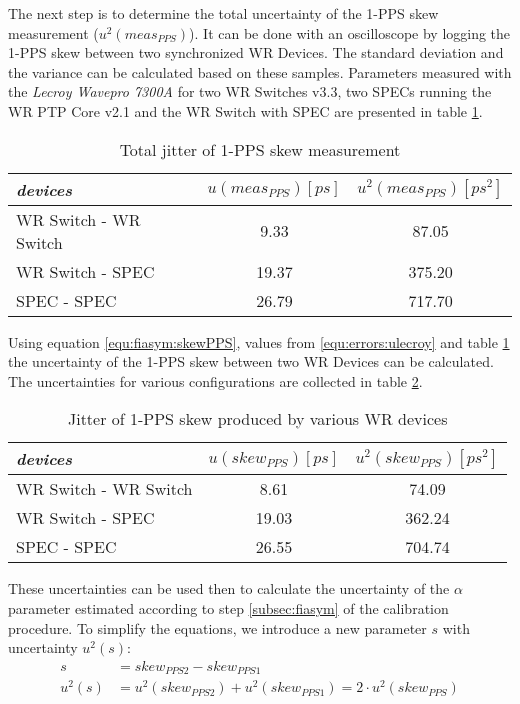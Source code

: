 The next step is to determine the total uncertainty of the 1-PPS skew measurement
($u^2(meas_{PPS})$). It can be done with an oscilloscope by logging the 1-PPS
skew between two synchronized WR Devices. The standard deviation and the
variance can be calculated based on these samples. Parameters measured with the
\emph{Lecroy Wavepro 7300A} for two WR Switches v3.3, two SPECs running the WR
PTP Core v2.1 and the WR Switch with SPEC are presented in table
\ref{tab:errors:ppsjitter}.
\begin{table}[ht]
	\begin{center}
	\begin{tabular}{|l|c|c|}
		\hline
    \emph{devices} & $u(meas_{PPS}) [ps]$ & $u^2(meas_{PPS}) [ps^2]$\\
		\hline
		WR Switch - WR Switch & 9.33 & 87.05\\
		WR Switch - SPEC & 19.37 & 375.20\\
	  SPEC - SPEC & 26.79 & 717.70\\
		\hline
	\end{tabular}
	\end{center}
  \caption{Total jitter of 1-PPS skew measurement}
	\label{tab:errors:ppsjitter}
\end{table}

Using equation \ref{equ:fiasym:skewPPS}, values from \ref{equ:errors:ulecroy}
and table \ref{tab:errors:ppsjitter} the uncertainty of the 1-PPS skew between
two WR Devices can be calculated. The uncertainties for various configurations
are collected in table \ref{tab:errors:skewpps}.
\begin{table}[ht]
  \begin{center}
    \begin{tabular}{|l|c|c|}
      \hline
      \emph{devices} & $u(skew_{PPS}) [ps]$ & $u^2(skew_{PPS}) [ps^2]$\\
      \hline
      WR Switch - WR Switch & 8.61  & 74.09\\
           WR Switch - SPEC & 19.03 & 362.24\\
                SPEC - SPEC & 26.55 & 704.74\\
      \hline
    \end{tabular}
  \end{center}
  \caption{Jitter of 1-PPS skew produced by various WR devices}
  \label{tab:errors:skewpps}
\end{table}

These uncertainties can be used then to calculate the uncertainty of the
$\alpha$ parameter estimated according to step \ref{subsec:fiasym} of the
calibration procedure. To simplify the equations, we introduce a new parameter
$s$ with uncertainty $u^2(s)$:
\begin{align}
	s &= skew_{PPS2} - skew_{PPS1}\\
  u^2(s) &= u^2(skew_{PPS2}) + u^2(skew_{PPS1}) = 2 \cdot u^2(skew_{PPS})
\end{align}

